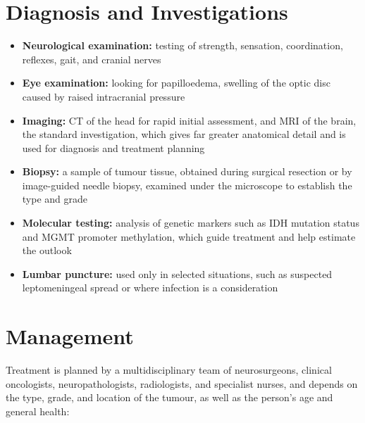 \section*{Diagnosis and Investigations}
\begin{itemize}
    \item \textbf{Neurological examination:} testing of strength, sensation, coordination, reflexes, gait, and cranial nerves
    \item \textbf{Eye examination:} looking for papilloedema, swelling of the optic disc caused by raised intracranial pressure
    \item \textbf{Imaging:} CT of the head for rapid initial assessment, and MRI of the brain, the standard investigation, which gives far greater anatomical detail and is used for diagnosis and treatment planning
    \item \textbf{Biopsy:} a sample of tumour tissue, obtained during surgical resection or by image-guided needle biopsy, examined under the microscope to establish the type and grade
    \item \textbf{Molecular testing:} analysis of genetic markers such as IDH mutation status and MGMT promoter methylation, which guide treatment and help estimate the outlook
    \item \textbf{Lumbar puncture:} used only in selected situations, such as suspected leptomeningeal spread or where infection is a consideration
\end{itemize}

\section*{Management}
Treatment is planned by a multidisciplinary team of neurosurgeons, clinical oncologists, neuropathologists, radiologists, and specialist nurses, and depends on the type, grade, and location of the tumour, as well as the person's age and general health:


